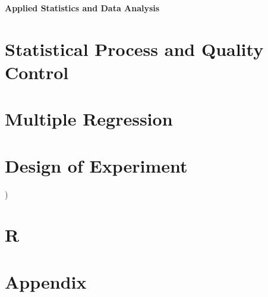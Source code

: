 \documentclass[10pt]{article}
\begin{document}
\footnotesize

\begin{center}
\Large{\textbf{Applied Statistics and Data Analysis}} \\
\end{center}
\begin{multicols*}{2}
\setlength{\premulticols}{1pt}
\setlength{\postmulticols}{1pt}
\setlength{\multicolsep}{1pt}
\setlength{\columnsep}{2pt}


\part{Statistical Process and Quality Control}






\part{Multiple Regression}






\part{Design of Experiment})





\part{R}


\newpage

\part*{Appendix}


\end{multicols*}
\end{document}
